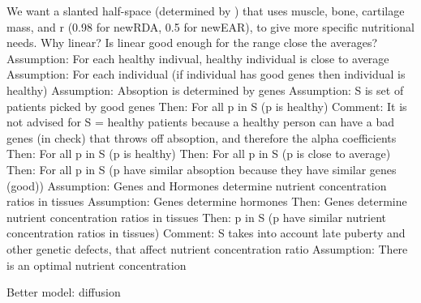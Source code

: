 \documentclass{article}
\begin{document}
We want a slanted half-space (determined by \vec{\alpha}) that uses muscle, bone, cartilage mass, and r (0.98 for newRDA, 0.5 for newEAR), to give more specific nutritional needs.
Why linear? Is linear good enough for the range close the averages?
Assumption: For each healthy indivual, healthy individual is close to average
Assumption: For each individual (if individual has good genes then individual is healthy)
Assumption: Absoption is determined by genes
Assumption: S is set of patients picked by good genes
Then: For all p in S (p is healthy)
Comment: It is not advised for S = {healthy patients} because a healthy person can have a bad genes (in check) that throws off absoption, and therefore the alpha coefficients
Then: For all p in S (p is healthy)
Then: For all p in S (p is close to average)
Then: For all p in S (p have similar absoption because they have similar genes (good))
Assumption: Genes and Hormones determine nutrient concentration ratios in tissues
Assumption: Genes determine hormones
Then: Genes determine nutrient concentration ratios in tissues
Then: p in S (p have similar nutrient concentration ratios in tissues)
Comment: S takes into account late puberty and other genetic defects, that affect nutrient concentration ratio
Assumption: There is an optimal nutrient concentration




Better model: diffusion
\end{document}
